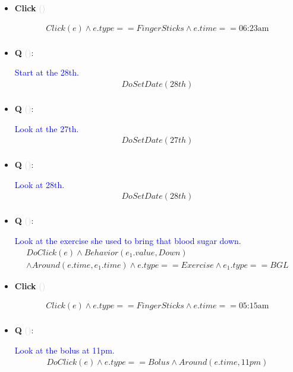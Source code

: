 \documentclass[11pt]{article}
\newcounter{CQ}
\newcounter{CClick}
\newcommand{\key}[1]{\textcolor{lightgray}{#1}}
\begin{document}
\begin{itemize}
	
	\item
	\textbf{Click\theCClick} \key{()} \addtocounter{CClick}{1}
	\begin{multline*}
	Click(e) \wedge e.type == FingerSticks \wedge e.time == \mbox{06:23am} \\
	\end{multline*}
	

	
	\item
	\textbf{Q\theCQ} \key{()}: \addtocounter{CQ}{1}
	\textcolor{blue}{ Start at the 28th. }
	\begin{multline*}
	DoSetDate(28th) \\
	\end{multline*}
	
	
	
	\item
	\textbf{Q\theCQ} \key{()}: \addtocounter{CQ}{1}
	\textcolor{blue}{ Look at the 27th. }
	\begin{multline*}
	DoSetDate(27th) \\
	\end{multline*}
	
	
	
	\item
	\textbf{Q\theCQ} \key{()}: \addtocounter{CQ}{1}
	\textcolor{blue}{ Look at 28th. }
	\begin{multline*}
	DoSetDate(28th) \\
	\end{multline*}
	
	
	
	
	\item
	\textbf{Q\theCQ} \key{()}: \addtocounter{CQ}{1}
	\textcolor{blue}{ Look at the exercise she used to bring that blood sugar down. }
	\begin{multline*}
	DoClick(e) \wedge Behavior(e_1.value, Down) \\
	\wedge Around(e.time, e_1.time) \wedge e.type == Exercise \wedge e_1.type==BGL
	\end{multline*}
	
	
	
	\item
	\textbf{Click\theCClick} \key{()} \addtocounter{CClick}{1}
	\begin{multline*}
	Click(e) \wedge e.type == FingerSticks \wedge e.time == \mbox{05:15am} \\
	\end{multline*}
	

	
	\item
	\textbf{Q\theCQ} \key{()}: \addtocounter{CQ}{1}
	\textcolor{blue}{ Look at the bolus at 11pm. }
	\begin{multline*}
	DoClick(e) \wedge e.type == Bolus \wedge Around(e.time, 11pm) \\
	\end{multline*}
	

\end{itemize}
\end{document}
